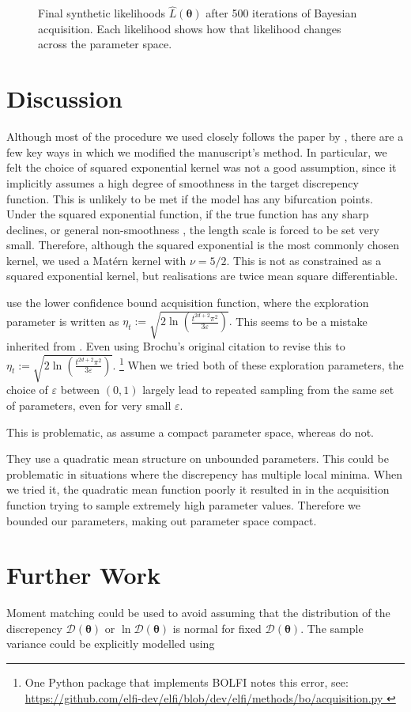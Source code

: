 \begin{figure}[htbp]
\begin{subfigure}[b]{0.5\textwidth}
    \end{subfigure}%
    \caption{
        Final synthetic likelihoods $\hat{L}(\bm{\theta})$ after 500 iterations 
        of Bayesian acquisition. Each likelihood shows how that likelihood 
        changes across the parameter space.
    }
    \label{fig:final_synth_lik}
\end{figure}

\section{Discussion}

Although most of the procedure we used closely follows the paper by
\cite{gutmann_bayesian_2016}, there are a few key ways in which we modified the
manuscript's method. In particular, we felt the choice of squared exponential
kernel was not a good assumption, since it implicitly assumes a high degree of
smoothness in the target discrepency function. This is unlikely to be met if
the model has any bifurcation points. Under the squared exponential function,
if the true function has any sharp declines, or general non-smoothness
, the length scale is forced to be set very small. Therefore,
although the squared exponential is the most commonly chosen kernel,
we used a Mat\'ern kernel with $\nu = 5/2$. This is not as constrained as a
squared exponential kernel, but realisations are twice mean square
differentiable.

\cite{gutmann_bayesian_2016} use the lower confidence bound acquisition 
function, where the
exploration parameter is written as
$\eta_t:= \sqrt{2\ln(\frac{t^{2d + 2}\pi^2}{3\varepsilon})}.$ This seems to be
a mistake inherited from \cite{brochu_tutorial_2010}. Even using Brochu's 
original 
citation
\parencite{srinivas_gaussian_2010} to revise this to
$\eta_t:= \sqrt{2\ln(\frac{t^{2d + 2}\pi^2}{3\varepsilon})}.$
\footnote{One Python package that implements BOLFI notes this error, see:
    \url{
        https://github.com/elfi-dev/elfi/blob/dev/elfi/methods/bo/acquisition.py
    }
} When we tried both of these exploration parameters, the choice of 
$\varepsilon$ between $(0, 1)$ largely lead to repeated sampling from the same
set of parameters, even for very small $\varepsilon.$

This is problematic, as \cite{srinivas_gaussian_2010} assume a compact 
parameter space, whereas \cite{gutmann_bayesian_2016} do not.

They use a quadratic mean structure on unbounded parameters.
This could be problematic in situations 
where the discrepency has multiple local minima. When we tried it,
the quadratic mean function poorly it resulted in
in the acquisition function trying to sample extremely high parameter values.
Therefore we bounded our parameters, making out parameter space compact. 

\section{Further Work}

Moment matching could be used to avoid assuming that the distribution of 
the discrepency $\mathcal{D}(\bm{\theta})$ or $\ln\mathcal{D}(\bm{\theta})$ 
is normal for fixed $\mathcal{D}(\bm{\theta}).$ The sample variance could
be explicitly modelled using 